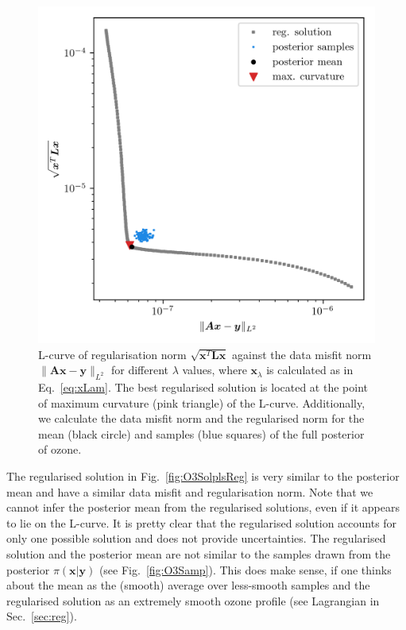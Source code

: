 \begin{figure}[ht!]
	\centering
	\includegraphics{LCurvePhD.png}
	\caption[Plot of the L-curve to find the regularised solution.]{L-curve of regularisation norm $\sqrt{\bm{x}^T\bm{Lx}}$ against the data misfit norm $\lVert \bm{A}\bm{x} - \bm{y} \rVert_{L^2}$ for different $\lambda$ values, where $\bm{x}_{\lambda}$ is calculated as in Eq.~\ref{eq:xLam}. The best regularised solution is located at the point of maximum curvature (pink triangle) of the L-curve. Additionally, we calculate the data misfit norm and the regularised norm for the mean (black circle) and samples (blue squares) of the full posterior of ozone.}
	\label{fig:LCurve}
\end{figure}
The regularised solution in Fig.~\ref{fig:O3SolplsReg} is very similar to the posterior mean and have a similar data misfit and regularisation norm.
Note that we cannot infer the posterior mean from the regularised solutions, even if it appears to lie on the L-curve.
It is pretty clear that the regularised solution accounts for only one possible solution and does not provide uncertainties. The regularised solution and the posterior mean are not similar to the samples drawn from the posterior $\pi(\bm{x}| \bm{y})$ (see Fig.~\ref{fig:O3Samp}).
This does make sense, if one thinks about the mean as the (smooth) average over less-smooth samples and the regularised solution as an extremely smooth ozone profile (see Lagrangian in Sec.~\ref{sec:reg}).
